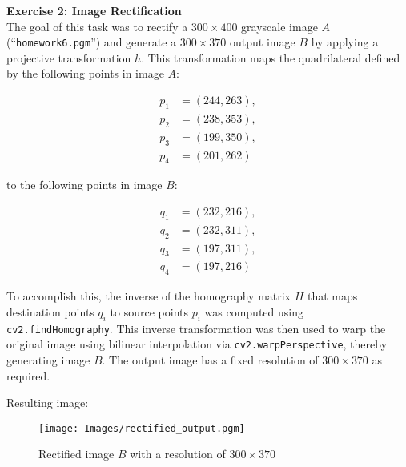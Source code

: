 \textbf{Exercise 2: Image Rectification}\\

The goal of this task was to rectify a \(300 \times 400\) grayscale image \(A\) (``\texttt{homework6.pgm}'') and generate a \(300 \times 370\) output image \(B\) by applying a projective transformation \(h\). This transformation maps the quadrilateral defined by the following points in image \(A\):

\[
\begin{aligned}
p_1 &= (244, 263), \\
p_2 &= (238, 353), \\
p_3 &= (199, 350), \\
p_4 &= (201, 262)
\end{aligned}
\]

to the following points in image \(B\):

\[
\begin{aligned}
q_1 &= (232, 216), \\
q_2 &= (232, 311), \\
q_3 &= (197, 311), \\
q_4 &= (197, 216)
\end{aligned}
\]

To accomplish this, the inverse of the homography matrix \(H\) that maps destination points \(q_i\) to source points \(p_i\) was computed using \texttt{cv2.findHomography}. This inverse transformation was then used to warp the original image using bilinear interpolation via \texttt{cv2.warpPerspective}, thereby generating image \(B\). The output image has a fixed resolution of \(300 \times 370\) as required.

Resulting image:
\begin{figure}
    \centering
    \texttt{[image: Images/rectified\_output.pgm]}
    \caption{Rectified image \(B\) with a resolution of \(300 \times 370\)}
\end{figure}